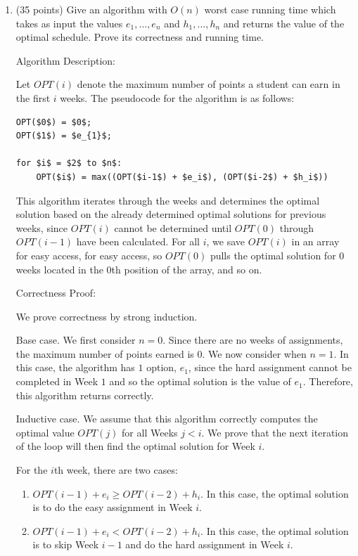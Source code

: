 \documentclass[11pt]{article}
\begin{document}
\begin{enumerate}
\item (35 points) Give an algorithm with $O(n)$ worst case running time which takes as input the values $e_1, \dots, e_n$ and $h_1, \dots, h_n$ and 
returns the value of the optimal schedule. Prove its correctness and running time.

\bigbreak

Algorithm Description:

Let $OPT(i)$ denote the maximum number of points a student can earn in the first $i$ weeks. The pseudocode for the algorithm is as follows: 

\begin{lstlisting}[mathescape]
OPT($0$) = $0$;
OPT($1$) = $e_{1}$;

for $i$ = $2$ to $n$:
    OPT($i$) = max((OPT($i-1$) + $e_i$), (OPT($i-2$) + $h_i$))
\end{lstlisting}

This algorithm iterates through the weeks and determines the optimal solution based on the already determined optimal solutions for previous weeks, 
since $OPT(i)$ cannot be determined until $OPT(0)$ through $OPT(i-1)$ have been calculated. For all $i$, we save $OPT(i)$ in an array for easy access,  
for easy access, so $OPT(0)$ pulls the optimal solution for $0$ weeks located in the $0$th position of the array, and so on.

\bigbreak

Correctness Proof:

We prove correctness by strong induction.

Base case. We first consider $n = 0$. Since there are no weeks of assignments, the maximum number of points earned is $0$. 
We now consider when $n = 1$. In this case, the algorithm has $1$ option, $e_{1}$, since the hard assignment cannot be completed in Week $1$
and so the optimal solution is the value of $e_{1}$. Therefore, this algorithm returns correctly.

Inductive case. We assume that this algorithm correctly computes the optimal value $OPT(j)$ for all Weeks $j < i$. 
We prove that the next iteration of the loop will then find the optimal solution for Week $i$. 

For the $i$th week, there are two cases:

\begin{enumerate}[label=(\arabic*), noitemsep]
\item $OPT(i-1) + e_i \geq OPT(i-2) + h_i$. In this case, the optimal solution is to do the easy assignment in Week $i$.
\item $OPT(i-1) + e_i < OPT(i-2) + h_i$. In this case, the optimal solution is to skip Week $i-1$ and do the hard assignment in Week $i$.
\end{enumerate}


\end{enumerate}
\end{document}
